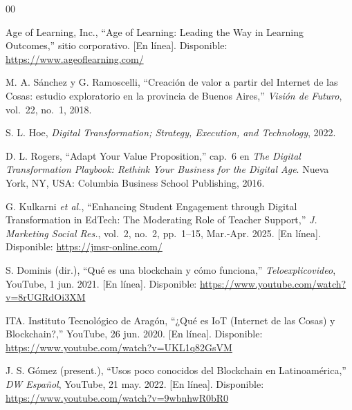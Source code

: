 \documentclass[conference]{IEEEtran}
\begin{document}
\begin{thebibliography}{00}

Age of Learning, Inc., ``Age of Learning: Leading the Way in Learning Outcomes,'' sitio corporativo. [En línea]. Disponible: \url{https://www.ageoflearning.com/}

M. A. Sánchez y G. Ramoscelli, ``Creación de valor a partir del Internet de las Cosas: estudio exploratorio en la provincia de Buenos Aires,'' \emph{Visión de Futuro}, vol.~22, no.~1, 2018.

S. L. Hoe, \emph{Digital Transformation; Strategy, Execution, and Technology}, 2022.

D. L. Rogers, ``Adapt Your Value Proposition,'' cap.~6 en \emph{The Digital Transformation Playbook: Rethink Your Business for the Digital Age}. Nueva York, NY, USA: Columbia Business School Publishing, 2016.

G. Kulkarni \emph{et al.}, ``Enhancing Student Engagement through Digital Transformation in EdTech: The Moderating Role of Teacher Support,'' \emph{J. Marketing Social Res.}, vol.~2, no.~2, pp.~1--15, Mar.-Apr. 2025. [En línea]. Disponible: \url{https://jmsr-online.com/}

S. Dominis (dir.), ``Qué es una blockchain y cómo funciona,'' \emph{Teloexplicovideo}, YouTube, 1 jun. 2021. [En línea]. Disponible: \url{https://www.youtube.com/watch?v=8rUGRdOi3XM}

ITA. Instituto Tecnológico de Aragón, ``¿Qué es IoT (Internet de las Cosas) y Blockchain?,'' YouTube, 26 jun. 2020. [En línea]. Disponible: \url{https://www.youtube.com/watch?v=UKL1q82GsVM}

J. S. Gómez (present.), ``Usos poco conocidos del Blockchain en Latinoamérica,'' \emph{DW Español}, YouTube, 21 may. 2022. [En línea]. Disponible: \url{https://www.youtube.com/watch?v=9wbnhwR0bR0}

\end{thebibliography}
\end{document}
